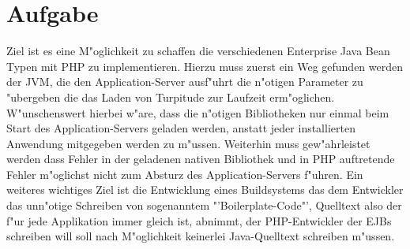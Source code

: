 \section{Aufgabe}
\label{sec:chap2:task}

Ziel ist es eine M"oglichkeit zu schaffen die verschiedenen Enterprise Java Bean Typen mit 
PHP zu implementieren. Hierzu muss zuerst ein Weg gefunden werden der JVM, die den Application-Server 
ausf"uhrt die n"otigen Parameter zu "ubergeben die das Laden von Turpitude zur Laufzeit erm"oglichen.
W"unschenswert hierbei w"are, dass die n"otigen Bibliotheken nur einmal beim Start des Application-Servers
geladen werden, anstatt jeder installierten Anwendung mitgegeben werden zu m"ussen. Weiterhin muss gew"ahrleistet
werden dass Fehler in der geladenen nativen Bibliothek und in PHP auftretende Fehler m"oglichst nicht zum Absturz des
Application-Servers f"uhren. Ein weiteres wichtiges Ziel ist die Entwicklung eines Buildsystems das dem
Entwickler das unn"otige Schreiben von sogenanntem "'Boilerplate-Code"', Quelltext also der f"ur jede
Applikation immer gleich ist, abnimmt, der PHP-Entwickler der EJBs schreiben will soll nach M"oglichkeit
keinerlei Java-Quelltext schreiben m"ussen.

